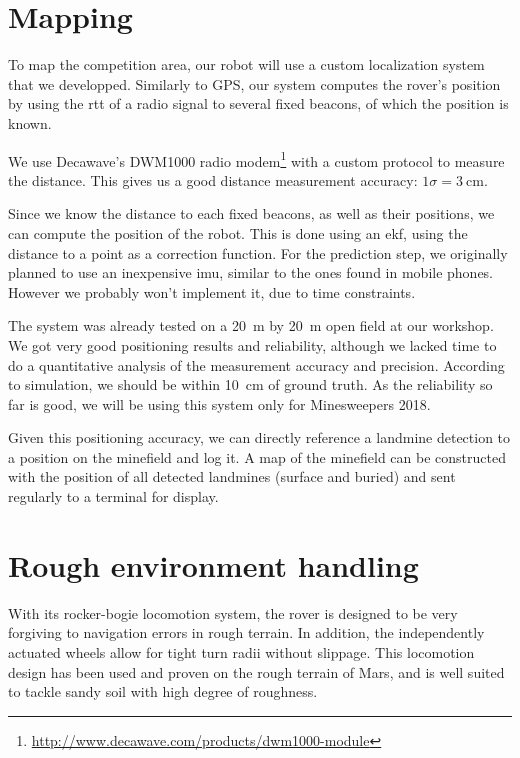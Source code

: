 \section{Mapping}

To map the competition area, our robot will use a custom localization system that we developped.
Similarly to GPS, our system computes the rover's position by using the \gls{rtt} of a radio signal to several fixed beacons, of which the position is known.

We use Decawave's DWM1000 radio modem\footnote{\url{http://www.decawave.com/products/dwm1000-module}} with a custom protocol to measure the distance.
This gives us a good distance measurement accuracy: $1 \sigma = \SI{3}{\centi\meter}$.

Since we know the distance to each fixed beacons, as well as their positions, we can compute the position of the robot.
This is done using an \gls{ekf}, using the distance to a point as a correction function.
For the prediction step, we originally planned to use an inexpensive \gls{imu}, similar to the ones found in mobile phones.
However we probably won't implement it, due to time constraints.

The system was already tested on a \SI{20}{\meter} by \SI{20}{\meter} open field at our workshop.
We got very good positioning results and reliability, although we lacked time to do a quantitative analysis of the measurement accuracy and precision.
According to simulation, we should be within \SI{10}{\centi\meter} of ground truth.
As the reliability so far is good, we will be using this system only for Minesweepers 2018.

Given this positioning accuracy, we can directly reference a landmine detection to a position on the minefield and log it.
A map of the minefield can be constructed with the position of all detected landmines (surface and buried) and sent regularly to a terminal for display.

\section{Rough environment handling}
With its rocker-bogie locomotion system, the rover is designed to be very forgiving to navigation errors in rough terrain.
In addition, the independently actuated wheels allow for tight turn radii without slippage.
This locomotion design has been used and proven on the rough terrain of Mars, and is well suited to tackle sandy soil with high degree of roughness.

